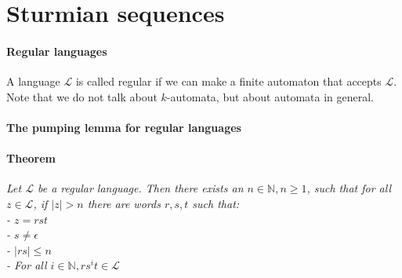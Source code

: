 \documentclass{article}
\begin{document}
\section*{Sturmian sequences}
\paragraph{Regular languages}
A language $\mathcal{L}$ is called regular if we can make a finite automaton
that accepts $\mathcal{L}$. Note that we do not talk about $k$-automata, but
about automata in general.

\paragraph{The pumping lemma for regular languages}
\paragraph{Theorem} \emph{Let $\mathcal{L}$ be a regular language. Then there 
exists an $n \in \mathbb{N}, n \ge 1$, such that for all $z \in \mathcal{L}$, 
if $|z| > n$ there are words $r, s, t$ such that:\\
- $z = rst$\\
- $s \ne \epsilon$\\
- $|rs| \le n$\\
- For all $i \in \mathbb{N}, r s^i t \in \mathcal{L}$}
\end{document}
